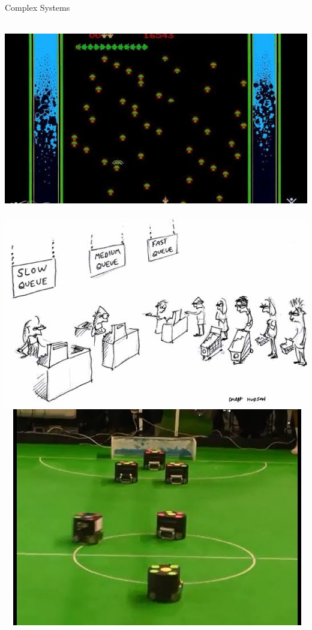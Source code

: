 \documentclass[10pt]{beamer}
\begin{document}
\begin{frame}[fragile]{Complex Systems}

$\mbox{ }$
\includegraphics[scale=0.125]{atari.jpg}
$\mbox{ }$
\includegraphics[scale=0.125]{queues1.jpg}
$\mbox{ }$
\includegraphics[scale=0.125]{robosoc.jpg}

\end{frame}
\end{document}
